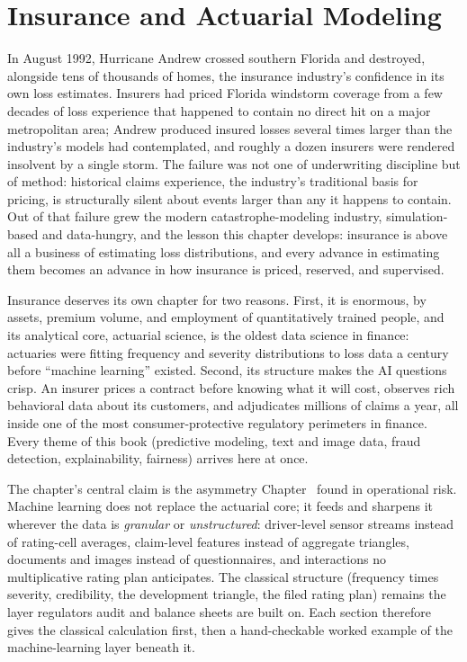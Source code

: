 \documentclass[../ai_in_finance]{subfiles}
\begin{document}
\chapter{Insurance and Actuarial Modeling}

In August 1992, Hurricane Andrew crossed southern Florida and destroyed, alongside tens of thousands of homes, the insurance industry's confidence in its own loss estimates. Insurers had priced Florida windstorm coverage from a few decades of loss experience that happened to contain no direct hit on a major metropolitan area; Andrew produced insured losses several times larger than the industry's models had contemplated, and roughly a dozen insurers were rendered insolvent by a single storm. The failure was not one of underwriting discipline but of method: historical claims experience, the industry's traditional basis for pricing, is structurally silent about events larger than any it happens to contain. Out of that failure grew the modern catastrophe-modeling industry, simulation-based and data-hungry, and the lesson this chapter develops: insurance is above all a business of estimating loss distributions, and every advance in estimating them becomes an advance in how insurance is priced, reserved, and supervised.

Insurance deserves its own chapter for two reasons. First, it is enormous, by assets, premium volume, and employment of quantitatively trained people, and its analytical core, actuarial science, is the oldest data science in finance: actuaries were fitting frequency and severity distributions to loss data a century before ``machine learning'' existed. Second, its structure makes the AI questions crisp. An insurer prices a contract before knowing what it will cost, observes rich behavioral data about its customers, and adjudicates millions of claims a year, all inside one of the most consumer-protective regulatory perimeters in finance. Every theme of this book (predictive modeling, text and image data, fraud detection, explainability, fairness) arrives here at once.

The chapter's central claim is the asymmetry Chapter~ found in operational risk. Machine learning does not replace the actuarial core; it feeds and sharpens it wherever the data is \emph{granular} or \emph{unstructured}: driver-level sensor streams instead of rating-cell averages, claim-level features instead of aggregate triangles, documents and images instead of questionnaires, and interactions no multiplicative rating plan anticipates. The classical structure (frequency times severity, credibility, the development triangle, the filed rating plan) remains the layer regulators audit and balance sheets are built on. Each section therefore gives the classical calculation first, then a hand-checkable worked example of the machine-learning layer beneath it.
\end{document}
